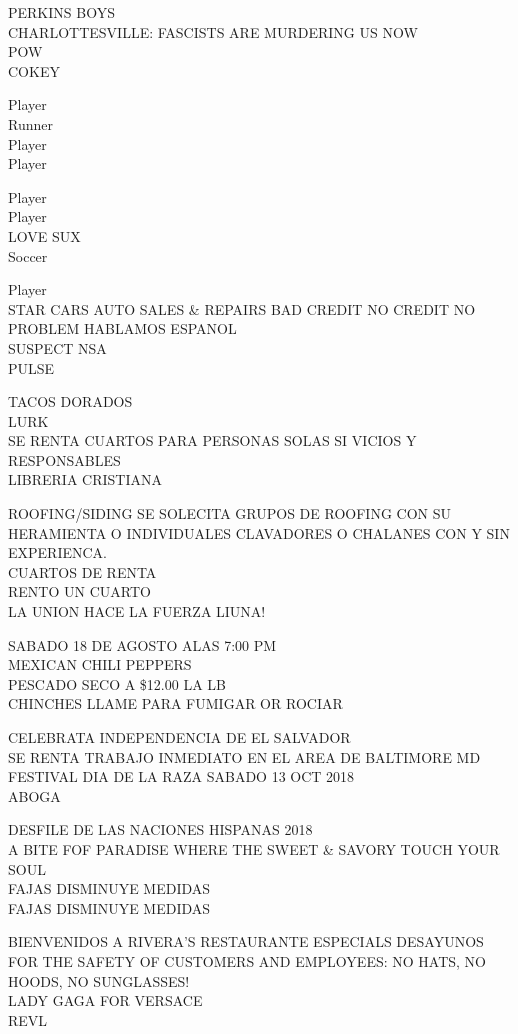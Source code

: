 \documentclass[10pt,letterpaper]{article}
\begin{document}
PERKINS BOYS\\
CHARLOTTESVILLE: FASCISTS ARE MURDERING US NOW\\
POW\\
COKEY

Player\\
Runner\\
Player\\
Player

Player\\
Player\\
LOVE SUX\\
Soccer

Player\\
STAR CARS AUTO SALES \& REPAIRS BAD CREDIT NO CREDIT NO PROBLEM HABLAMOS ESPANOL\\
SUSPECT NSA\\
PULSE

TACOS DORADOS\\
LURK\\
SE RENTA CUARTOS PARA PERSONAS SOLAS SI VICIOS Y RESPONSABLES\\
LIBRERIA CRISTIANA

ROOFING/SIDING SE SOLECITA GRUPOS DE ROOFING CON SU HERAMIENTA O INDIVIDUALES CLAVADORES O CHALANES CON Y SIN EXPERIENCA.\\
CUARTOS DE RENTA\\
RENTO UN CUARTO\\
LA UNION HACE LA FUERZA LIUNA!

SABADO 18 DE AGOSTO ALAS 7:00 PM\\
MEXICAN CHILI PEPPERS\\
PESCADO SECO A \$12.00 LA LB\\
CHINCHES LLAME PARA FUMIGAR OR ROCIAR

CELEBRATA INDEPENDENCIA DE EL SALVADOR\\
SE RENTA TRABAJO INMEDIATO EN EL AREA DE BALTIMORE MD\\
FESTIVAL DIA DE LA RAZA SABADO 13 OCT 2018\\
ABOGA

DESFILE DE LAS NACIONES HISPANAS 2018\\
A BITE FOF PARADISE WHERE THE SWEET \& SAVORY TOUCH YOUR SOUL\\
FAJAS DISMINUYE MEDIDAS\\
FAJAS DISMINUYE MEDIDAS

BIENVENIDOS A RIVERA'S RESTAURANTE ESPECIALS DESAYUNOS\\
FOR THE SAFETY OF CUSTOMERS AND EMPLOYEES: NO HATS, NO HOODS, NO SUNGLASSES!\\
LADY GAGA FOR VERSACE\\
REVL
\end{document}
